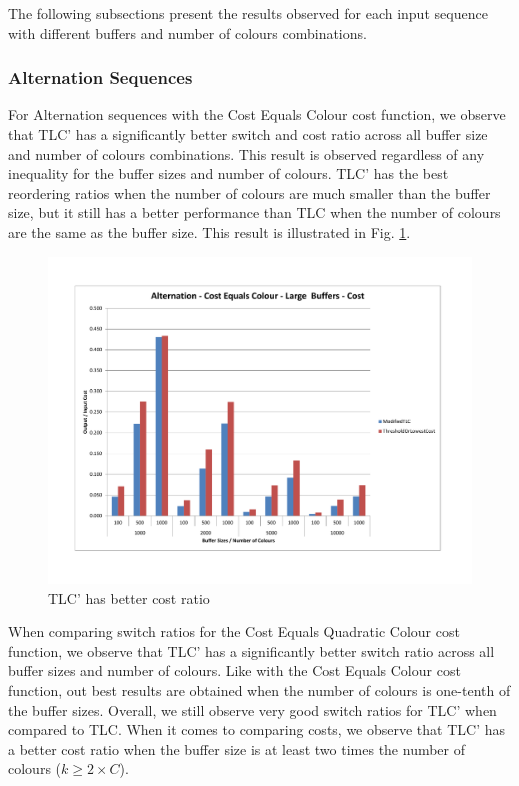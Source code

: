 The following subsections present the results observed for each input sequence with different buffers and number of colours combinations. 

\subsubsection{Alternation Sequences}

For Alternation sequences with the Cost Equals Colour cost function, we observe that TLC' has a significantly better switch and cost ratio across all buffer size and number of colours combinations. This result is observed regardless of any inequality for the buffer sizes and number of colours. TLC' has the best reordering ratios when the number of colours are much smaller than the buffer size, but it still has a better performance than TLC when the number of colours are the same as the buffer size. This result is illustrated in Fig. \ref{alternationCCLargeCost}.

\begin{figure}[ht]
\centering 
\includegraphics[scale=0.60]{Alternation-cc-large-cost.pdf}
\caption{TLC' has better cost ratio}
\label{alternationCCLargeCost}
\end{figure}   

When comparing switch ratios for the Cost Equals Quadratic Colour cost function, we observe that TLC' has a significantly better switch ratio across all buffer sizes and number of colours. Like with the Cost Equals Colour cost function, out best results are obtained when the number of colours is one-tenth of the buffer sizes. Overall, we still observe very good switch ratios for TLC' when compared to TLC. When it comes to comparing costs, we observe that TLC' has a better cost ratio when the buffer size is at least two times the number of colours ($ k\geq 2 \times C$). 


